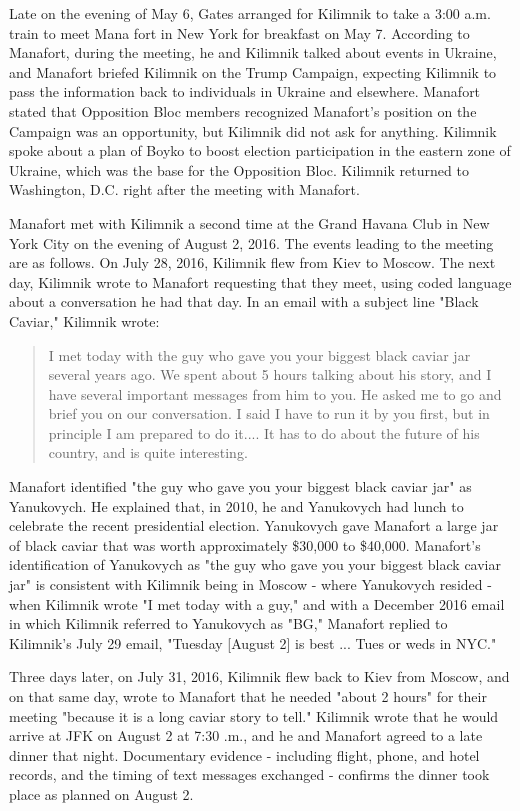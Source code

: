 Late on the evening of May 6, Gates arranged for Kilimnik to take a 3:00 a.m. train to meet Mana fort in New York for breakfast on May 7. %
According to Manafort, during the meeting, he and Kilimnik talked about events in Ukraine, and Manafort briefed Kilimnik on the Trump Campaign, expecting Kilimnik to pass the information back to individuals in Ukraine and elsewhere.%
Manafort stated that Opposition Bloc members recognized Manafort's position on the Campaign was an opportunity, but Kilimnik did not ask for anything.%
Kilimnik spoke about a plan of Boyko to boost election participation in the eastern zone of Ukraine, which was the base for the Opposition Bloc.%
Kilimnik returned to Washington, D.C. right after the meeting with Manafort.

Manafort met with Kilimnik a second time at the Grand Havana Club in New York City on the evening of August 2, 2016.
The events leading to the meeting are as follows.
On July 28, 2016, Kilimnik flew from Kiev to Moscow.%
The next day, Kilimnik wrote to Manafort requesting that they meet, using coded language about a conversation he had that day.%
In an email with a subject line "Black Caviar," Kilimnik wrote:

\begin{quote}
I met today with the guy who gave you your biggest black caviar jar several years ago.
We spent about 5 hours talking about his story, and I have several important messages from him to you.
He asked me to go and brief you on our conversation.
I said I have to run it by you first, but in principle I am prepared to do it....
It has to do about the future of his country, and is quite interesting.%
\end{quote}

Manafort identified "the guy who gave you your biggest black caviar jar" as Yanukovych.
He explained that, in 2010, he and Yanukovych had lunch to celebrate the recent presidential election.
Yanukovych gave Manafort a large jar of black caviar that was worth approximately \$30,000 to \$40,000.%
Manafort's identification of Yanukovych as "the guy who gave you your biggest black caviar jar" is consistent with Kilimnik being in Moscow - where Yanukovych resided - when Kilimnik wrote "I met today with a guy," and with a December 2016 email in which Kilimnik referred to Yanukovych as "BG,"
Manafort replied to Kilimnik's July 29 email, "Tuesday [August 2] is best ... Tues or weds in NYC."%

Three days later, on July 31, 2016, Kilimnik flew back to Kiev from Moscow, and on that same day, wrote to Manafort that he needed "about 2 hours" for their meeting "because it is a long caviar story to tell."%
Kilimnik wrote that he would arrive at JFK on August 2 at 7:30 .m., and he and Manafort agreed to a late dinner that night.%
Documentary evidence - including flight, phone, and hotel records, and the timing of text messages exchanged%
- confirms the dinner took place as planned on August 2.%

